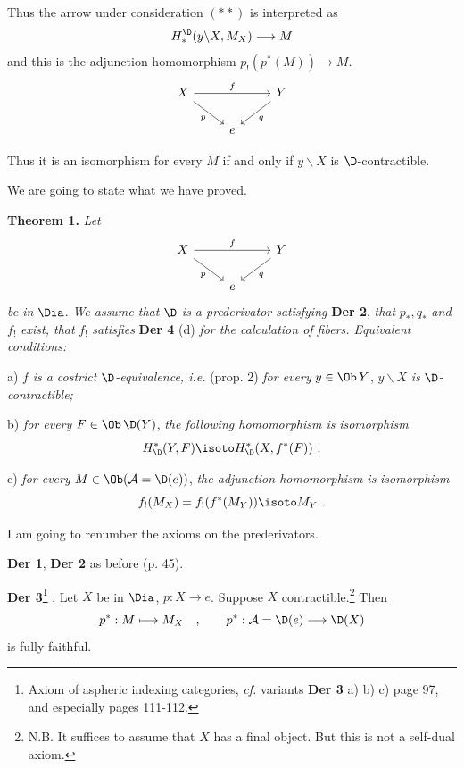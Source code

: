
\noindent Thus the arrow under consideration $(**)$ is interpreted as
\[
H_*^{\D}(y\backslash X, M_X) \longrightarrow M
\]
and this is the adjunction homomorphism $p_!(p^*(M)) \to M$.
\[
\begin{tikzcd}
X \arrow[rr, "f"] \arrow[dr, "p"{swap}] & & Y \arrow[dl, "q"] \\
& e &
\end{tikzcd}
\]

\noindent Thus it is an isomorphism for every $M$ if and only if $y\backslash X$ is $\D$-contractible.

\noindent We are going to state what we have proved.

\noindent\textbf{Theorem 1.} \textit{Let}
\[
\begin{tikzcd}
X \arrow[rr, "f"] \arrow[dr, "p"{swap}] & & Y \arrow[dl, "q"] \\
& e &
\end{tikzcd}
\]
\textit{be in} $\Dia$. \textit{We assume that} $\D$ \textit{is a prederivator satisfying} \textbf{Der 2}, \textit{that} $p_*, q_*$ \textit{and} $f_!$ \textit{exist, that} $f_!$ \textit{satisfies} \textbf{Der 4} (d) \textit{for the calculation of fibers. Equivalent conditions:}

a) $f$ \textit{is a costrict} $\D$\textit{-equivalence, i.e.} (prop. 2) \textit{for every} $y \in \Ob\, Y$, $y\backslash X$ \textit{is} $\D$\textit{-contractible;}

b) \textit{for every} $F \in \Ob\, \D(Y)$, \textit{the following homomorphism is} \textit{isomorphism}
\[
H^*_{\D}(Y, F) \isoto H^*_{\D}(X, f^*(F)) \ ;
\]

c) \textit{for every} $M \in \Ob(\mathcal{A} = \D(e))$, \textit{the adjunction homomorphism is} \textit{isomorphism}
\[
f_!(M_X) = f_!(f^*(M_Y)) \isoto M_Y \ .
\]

I am going to renumber the axioms on the prederivators. %

\noindent\textbf{Der 1}, \textbf{Der 2} as before (p. 45).

\noindent\textbf{Der 3}\footnote[28]{Axiom of aspheric indexing categories, \textit{cf.} variants \textbf{Der 3} a) b) c) page 97, and especially pages 111-112.} : Let $X$ be in $\Dia$, $p : X \to e$. Suppose $X$ contractible.\footnote[29]{N.B. It suffices to assume that $X$ has a final object. But this is not a self-dual axiom.} Then
\[
p^* : M \longmapsto M_X \quad , \qquad p^* : \mathcal{A} = \D(e) \longrightarrow \D(X)
\]
is fully faithful.

